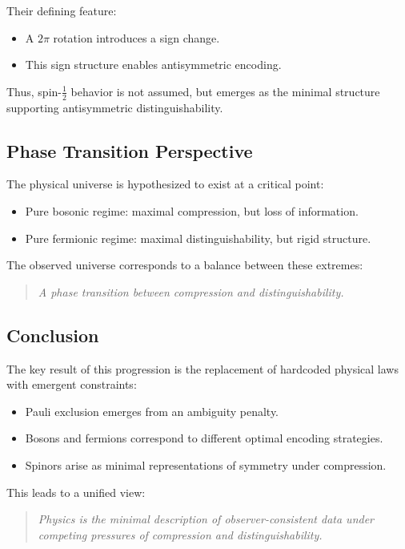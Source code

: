 \documentclass[11pt]{article}
\begin{document}
Their defining feature:
\begin{itemize}
    \item A $2\pi$ rotation introduces a sign change.
    \item This sign structure enables antisymmetric encoding.
\end{itemize}

Thus, spin-$\tfrac{1}{2}$ behavior is not assumed, but emerges as the minimal structure supporting antisymmetric distinguishability.

\subsection{Phase Transition Perspective}

The physical universe is hypothesized to exist at a critical point:

\begin{itemize}
    \item Pure bosonic regime: maximal compression, but loss of information.
    \item Pure fermionic regime: maximal distinguishability, but rigid structure.
\end{itemize}

The observed universe corresponds to a balance between these extremes:

\begin{quote}
\emph{A phase transition between compression and distinguishability.}
\end{quote}


\subsection{Conclusion}

The key result of this progression is the replacement of hardcoded physical laws with emergent constraints:

\begin{itemize}
    \item Pauli exclusion emerges from an ambiguity penalty.
    \item Bosons and fermions correspond to different optimal encoding strategies.
    \item Spinors arise as minimal representations of symmetry under compression.
\end{itemize}

This leads to a unified view:

\begin{quote}
\emph{Physics is the minimal description of observer-consistent data under competing pressures of compression and distinguishability.}
\end{quote}
\end{document}
